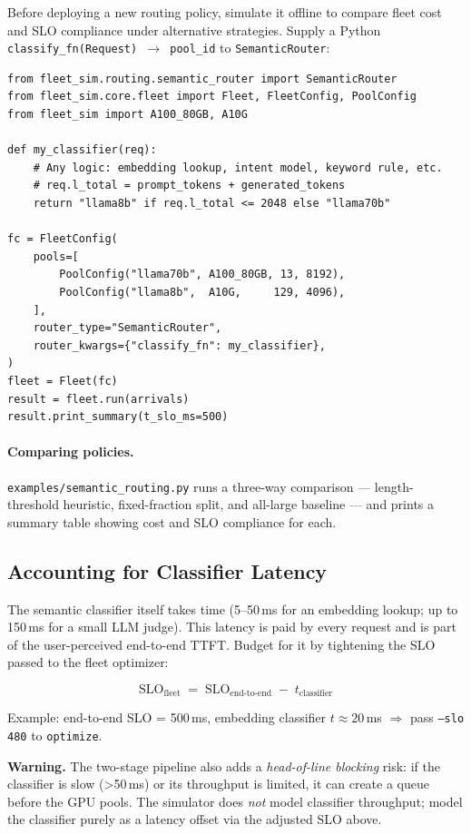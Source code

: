 \documentclass[11pt,a4paper]{article}
\newenvironment{warning}
  {\begin{mdframed}[backgroundcolor=orange!8!white,linecolor=orange!70!black,linewidth=1pt]
   \textbf{Warning. }\ignorespaces}
  {\end{mdframed}}
\begin{document}
Before deploying a new routing policy, simulate it offline to compare
fleet cost and SLO compliance under alternative strategies.  Supply a
Python \texttt{classify\_fn(Request) $\to$ pool\_id} to
\texttt{SemanticRouter}:

\begin{lstlisting}[style=python]
from fleet_sim.routing.semantic_router import SemanticRouter
from fleet_sim.core.fleet import Fleet, FleetConfig, PoolConfig
from fleet_sim import A100_80GB, A10G

def my_classifier(req):
    # Any logic: embedding lookup, intent model, keyword rule, etc.
    # req.l_total = prompt_tokens + generated_tokens
    return "llama8b" if req.l_total <= 2048 else "llama70b"

fc = FleetConfig(
    pools=[
        PoolConfig("llama70b", A100_80GB, 13, 8192),
        PoolConfig("llama8b",  A10G,     129, 4096),
    ],
    router_type="SemanticRouter",
    router_kwargs={"classify_fn": my_classifier},
)
fleet = Fleet(fc)
result = fleet.run(arrivals)
result.print_summary(t_slo_ms=500)
\end{lstlisting}

\paragraph{Comparing policies.}
\texttt{examples/semantic\_routing.py} runs a three-way comparison ---
length-threshold heuristic, fixed-fraction split, and all-large baseline
--- and prints a summary table showing cost and SLO compliance for each.

\subsection{Accounting for Classifier Latency}

The semantic classifier itself takes time (5--50\,ms for an embedding
lookup; up to 150\,ms for a small LLM judge).  This latency is paid by
every request and is part of the user-perceived end-to-end TTFT.  Budget
for it by tightening the SLO passed to the fleet optimizer:

\[
  \text{SLO}_{\text{fleet}} \;=\; \text{SLO}_{\text{end-to-end}} \;-\; t_{\text{classifier}}
\]

\noindent
Example: end-to-end SLO = 500\,ms, embedding classifier $t \approx 20$\,ms
$\Rightarrow$ pass \texttt{--slo 480} to \texttt{optimize}.

\begin{warning}
  The two-stage pipeline also adds a \emph{head-of-line blocking} risk: if
  the classifier is slow (>50\,ms) or its throughput is limited, it can
  create a queue before the GPU pools.  The simulator does \emph{not} model
  classifier throughput; model the classifier purely as a latency offset
  via the adjusted SLO above.
\end{warning}
\end{document}
